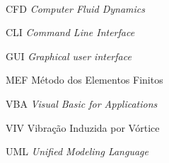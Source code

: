 

\imprimirfolhaderosto\













\listoffigures*
\cleardoublepage

\listoftables*
\cleardoublepage

\begin{siglas}
  \item[CFD] \textit{Computer Fluid Dynamics}
  \item[CLI] \textit{Command Line Interface}
  \item[GUI] \textit{Graphical user interface}
  \item[MEF] Método dos Elementos Finitos
  \item[VBA] \textit{Visual Basic for Applications}
  \item[VIV] Vibração Induzida por Vórtice
  \item[UML] \textit{Unified Modeling Language}
\end{siglas}


\tableofcontents*
\cleardoublepage